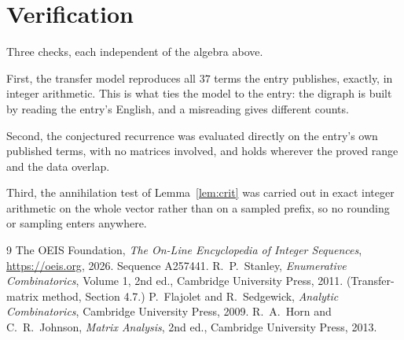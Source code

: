 \documentclass[11pt,a4paper]{article}
\theoremstyle{plain}
\theoremstyle{definition}
\begin{document}
\section{Verification}

Three checks, each independent of the algebra above.

First, the transfer model reproduces all $37$ terms the entry publishes, exactly, in
integer arithmetic. This is what ties the model to the entry: the digraph is built by reading
the entry's English, and a misreading gives different counts.

Second, the conjectured recurrence was evaluated directly on the entry's own published terms,
with no matrices involved, and holds wherever the proved range and the data overlap.

Third, the annihilation test of Lemma~\ref{lem:crit} was carried out in exact integer
arithmetic on the whole vector rather than on a sampled prefix, so no rounding or sampling
enters anywhere.

\begin{thebibliography}{9}
 The OEIS Foundation, \emph{The On-Line Encyclopedia of Integer
Sequences}, \url{https://oeis.org}, 2026. Sequence A257441.
 R.~P.~Stanley, \emph{Enumerative Combinatorics}, Volume 1, 2nd ed.,
Cambridge University Press, 2011. (Transfer-matrix method, Section 4.7.)
 P.~Flajolet and R.~Sedgewick, \emph{Analytic Combinatorics}, Cambridge
University Press, 2009.
 R.~A.~Horn and C.~R.~Johnson, \emph{Matrix Analysis}, 2nd ed., Cambridge
University Press, 2013.
\end{thebibliography}
\end{document}
